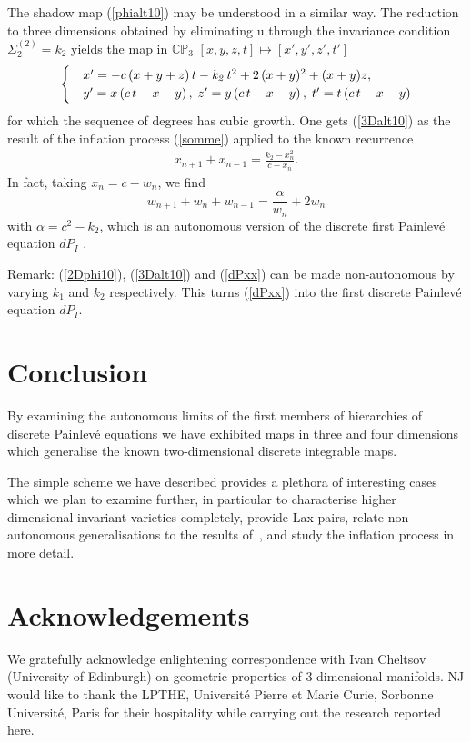 \documentclass[reqno]{amsart}
\numberwithin{equation}{section}
\numberwithin{figure}{section}
\begin{document}
The shadow map (\ref{phialt10}) may be understood in a similar way.
The reduction to three dimensions obtained by eliminating u through
the invariance condition $\Sigma_2^{(2)}=k_2$ yields the map in
$\mathbb C \mathbb P_3$ $[x,y,z,t] \mapsto [x',y',z',t']$
\begin{eqnarray}
  \label{3Dalt10}
  \begin{cases}
  &   x'= -c \left( x+y+z \right) t-{\it k_2}\,{t}^{2}+2\,(x+y)^{2} +(x +y)z, \\
    &
    y'=   x \left( c\,t-x-y \right) ,\; z'=y \left( c\,t-x-y \right) ,\;
    t'= t \left( c\,t-x-y \right)
    \end{cases}
\end{eqnarray}
for which the sequence of degrees has cubic growth. One gets
(\ref{3Dalt10}) as the result of the inflation process (\ref{somme})
applied to the known recurrence
\begin{eqnarray}
  \label{dPxx}
    x_{n+1} + x_{n-1} =  \frac{k_2 - x_n^2}{c - x_n}.
  \end{eqnarray}
  In fact, taking $x_n=c-w_n$,  we find
  \[
  w_{n+1}+w_n+w_{n-1}=\frac{\alpha}{w_n}+2 w_n
  \]
  with $\alpha=c^2-k_2$, which is an autonomous version of the discrete
  first Painlev\'e equation $dP_I$ \cite{FoItKi91}.
  
  Remark: (\ref{2Dphi10}), (\ref{3Dalt10}) and (\ref{dPxx}) can be
  made non-autonomous by varying $k_1$ and $k_2$ respectively. This
  turns (\ref{dPxx}) into the first discrete Painlev\'e equation
  $dP_I$.
 

\section{Conclusion}\label{section:conclusion}

By examining the autonomous limits of the first members of hierarchies
of discrete Painlev\'e equations we have exhibited maps in three and
four dimensions which generalise the known two-dimensional discrete
integrable maps.

The simple scheme we have described provides a plethora of interesting
cases which we plan to examine further, in particular to  characterise
higher dimensional invariant varieties completely, provide Lax pairs,
relate non-autonomous generalisations to the results
of~\cite{KaNaSa13}, and study the inflation process in more detail.
\section*{Acknowledgements} 
We gratefully acknowledge enlightening correspondence with Ivan
Cheltsov (University of Edinburgh) on geometric properties of
3-dimensional manifolds.  NJ would like to thank the LPTHE,
Universit\'e Pierre et Marie Curie, Sorbonne Universit\'e, Paris for
their hospitality while carrying out the research reported here.
\end{document}
